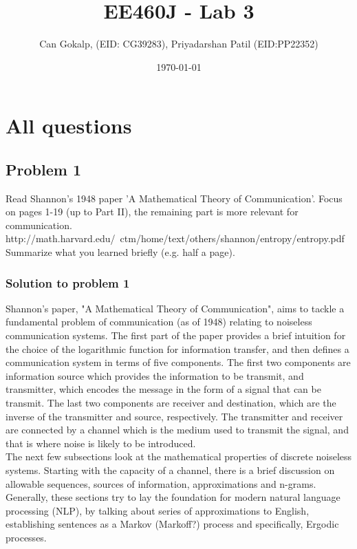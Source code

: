 \documentclass[12pt]{article}%
\begin{document}
\title{EE460J - Lab 3}
\author{Can Gokalp, (EID: CG39283), Priyadarshan Patil (EID:PP22352)}
\date{\today}
\maketitle

\section{All questions}


\subsection{Problem 1}

Read Shannon's 1948 paper 'A Mathematical Theory of Communication'. Focus on pages 1-19 (up to Part II), the remaining part is more relevant for communication. http://math.harvard.edu/~ctm/home/text/others/shannon/entropy/entropy.pdf Summarize what you learned briefly (e.g. half a page).

\subsubsection{Solution to problem 1}

Shannon's paper, "A Mathematical Theory of Communication", aims to tackle a fundamental problem of communication (as of 1948) relating to noiseless communication systems. The first part of the paper provides a brief intuition for the choice of the logarithmic function for information transfer, and then defines a communication system in terms of five components. The first two components are information source which provides the information to be transmit, and transmitter, which encodes the message in the form of a signal that can be transmit. The last two components are receiver and destination, which are the inverse of the transmitter and source, respectively. The transmitter and receiver are connected by a channel which is the medium used to transmit the signal, and that is where noise is likely to be introduced.\\

The next few subsections look at the mathematical properties of discrete noiseless systems. Starting with the capacity of a channel, there is a brief discussion on allowable sequences, sources of information, approximations and n-grams. Generally, these sections try to lay the foundation for modern natural language processing (NLP), by talking about series of approximations to English, establishing sentences as a Markov (Markoff?) process and specifically, Ergodic processes.
\end{document}
